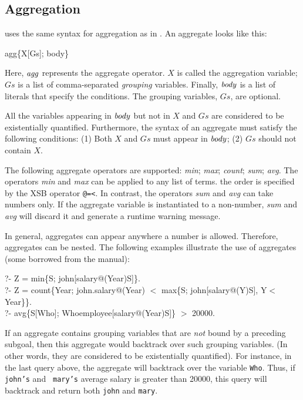 \documentclass[11pt]{report}
\begin{document}
\subsection{Aggregation}

\FLORA uses the same syntax for aggregation as in \FLORID. An aggregate
looks like this:
\begin{qrules}
agg\{X[Gs]; body\}
\end{qrules}
Here, ${\it agg}$ represents the aggregate operator. $X$ is called the
aggregation variable; $Gs$ is a list of comma-separated \emph{grouping}
variables. Finally, ${\it body}$ is a list of literals that specify the
conditions. The grouping variables, $Gs$, are optional.

All the variables appearing in ${\it body}$ but not in $X$ and $Gs$ are
considered to be existentially quantified. Furthermore, the syntax of an
aggregate must satisfy the following conditions: (1) Both $X$ and $Gs$ must
appear in ${\it body}$; (2) $Gs$ should not contain $X$.

The following aggregate operators are supported: {\it min}; {\it max}; {\it
  count}; {\it sum}; {\it avg}. The operators {\it min} and {\it max} can
be applied to any list of terms. the order is specified by the XSB operator
{\tt @=<}.  In contrast, the operators {\it sum} and {\it avg} can take
numbers only. If the aggregate variable is instantiated to a non-number,
{\it sum} and {\it avg} will discard it and generate a runtime warning
message.

In general, aggregates can appear anywhere a number is allowed. Therefore,
aggregates can be nested. The following examples illustrate the use of
aggregates (some borrowed from the \FLORID manual):
\begin{qrules}
?- Z = min\{S; john[salary@(Year){\fd}S]\}. \\
?- Z = count\{Year; john.salary@(Year) $<$ max\{S; john[salary@(Y){\fd}S], Y$<$Year\}\}. \\
?- avg\{S[Who]; Who{\isa}employee[salary@(Year){\fd}S]\} $>$ 20000.
\end{qrules}

If an aggregate contains grouping variables that are \emph{not} bound by a
preceding subgoal, then this aggregate would backtrack over such grouping
variables. (In other words, they are considered to be existentially
quantified). For instance, in the last query above, the aggregate will
backtrack over the variable {\tt Who}. Thus, if {\tt john's} and {\tt
  mary's} average salary is greater than 20000, this query will backtrack
and return both {\tt john} and {\tt mary}.
\end{document}
